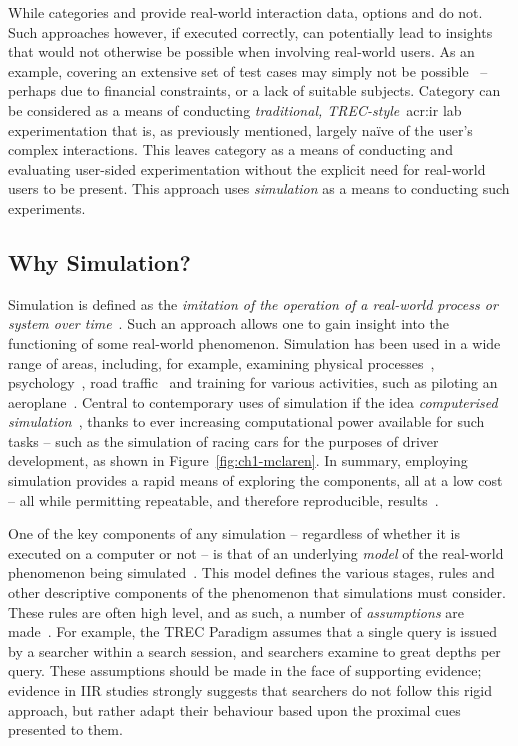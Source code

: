 While categories  and  provide real-world interaction data, options  and  do not. Such approaches however, if executed correctly, can potentially lead to insights that would not otherwise be possible when involving real-world users. As an example, covering an extensive set of test cases may simply not be possible~\citep{keskustalo2008user_simulation} -- perhaps due to financial constraints, or a lack of suitable subjects. Category  can be considered as a means of conducting \emph{traditional, TREC-style}~\gls{acr:ir} lab experimentation that is, as previously mentioned, largely na\"{i}ve of the user's complex interactions. This leaves category  as a means of conducting and evaluating user-sided experimentation without the explicit need for real-world users to be present. This approach uses \emph{simulation} as a means to conducting such experiments.

\subsection{Why Simulation?}
Simulation is defined as the \emph{imitation of the operation of a real-world process or system over time}~\citep{banks1996discrete}. Such an approach allows one to gain insight into the functioning of some real-world phenomenon. Simulation has been used in a wide range of areas, including, for example, examining physical processes~\citep{haessig1991physics_modelling}, psychology~\citep{hastie1988human_memory_simulation}, road traffic~\citep{mahmud2016traffic_modelling_electric} and training for various activities, such as piloting an aeroplane~\citep{sparko2010flight_simulators}. Central to contemporary uses of simulation if the idea \emph{computerised simulation}~\citep{heermann1990computer_simulation}, thanks to ever increasing computational power available for such tasks -- such as the simulation of racing cars for the purposes of driver development, as shown in Figure~\ref{fig:ch1-mclaren}. In summary, employing simulation provides a rapid means of exploring the components, all at a low cost -- all while permitting repeatable, and therefore reproducible, results~\citep{maxwell2016agents}.

One of the key components of any simulation -- regardless of whether it is executed on a computer or not -- is that of an underlying \emph{model} of the real-world phenomenon being simulated~\citep{tocher1963art_of_simulation}. This model defines the various stages, rules and other descriptive components of the phenomenon that simulations must consider. These rules are often high level, and as such, a number of \emph{assumptions} are made~\citep{tocher1963art_of_simulation}. For example, the TREC Paradigm assumes that a single query is issued by a searcher within a search session, and searchers examine to great depths per query. These assumptions should be made in the face of supporting evidence; evidence in IIR studies strongly suggests that searchers do not follow this rigid approach, but rather adapt their behaviour based upon the proximal cues presented to them.

